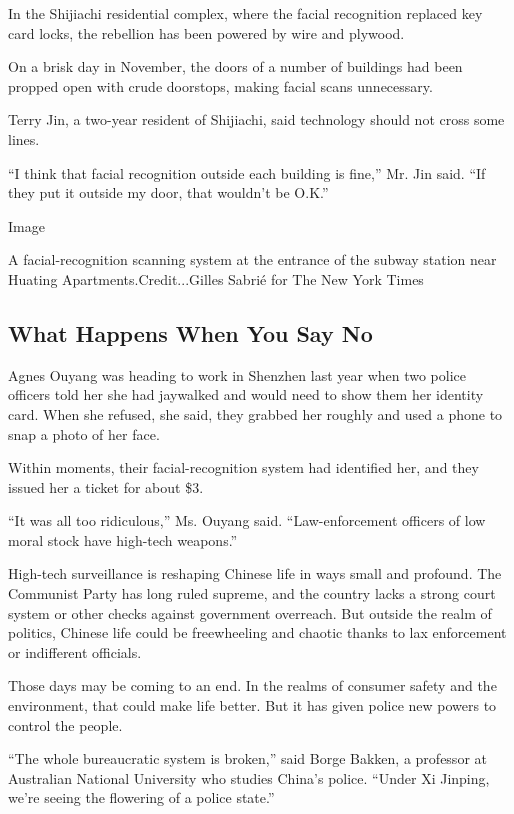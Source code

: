 In the Shijiachi residential complex, where the facial recognition
replaced key card locks, the rebellion has been powered by wire and
plywood.

On a brisk day in November, the doors of a number of buildings had been
propped open with crude doorstops, making facial scans unnecessary.

Terry Jin, a two-year resident of Shijiachi, said technology should not
cross some lines.

``I think that facial recognition outside each building is fine,'' Mr.
Jin said. ``If they put it outside my door, that wouldn't be O.K.''

Image

A facial-recognition scanning system at the entrance of the subway
station near Huating Apartments.Credit...Gilles Sabrié for The New York
Times

\hypertarget{what-happens-when-you-say-no}{%
\subsection{What Happens When You Say
No}\label{what-happens-when-you-say-no}}

Agnes Ouyang was heading to work in Shenzhen last year when two police
officers told her she had jaywalked and would need to show them her
identity card. When she refused, she said, they grabbed her roughly and
used a phone to snap a photo of her face.

Within moments, their facial-recognition system had identified her, and
they issued her a ticket for about \$3.

``It was all too ridiculous,'' Ms. Ouyang said. ``Law-enforcement
officers of low moral stock have high-tech weapons.''

High-tech surveillance is reshaping Chinese life in ways small and
profound. The Communist Party has long ruled supreme, and the country
lacks a strong court system or other checks against government
overreach. But outside the realm of politics, Chinese life could be
freewheeling and chaotic thanks to lax enforcement or indifferent
officials.

Those days may be coming to an end. In the realms of consumer safety and
the environment, that could make life better. But it has given police
new powers to control the people.

``The whole bureaucratic system is broken,'' said Borge Bakken, a
professor at Australian National University who studies China's police.
``Under Xi Jinping, we're seeing the flowering of a police state.''

